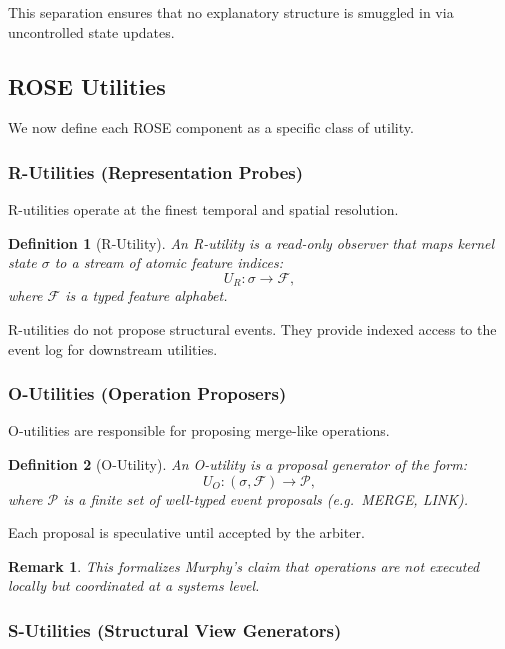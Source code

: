 \documentclass[11pt]{article}
\newtheorem{definition}{Definition}
\newtheorem{remark}{Remark}
\begin{document}
This separation ensures that no explanatory structure is smuggled in via uncontrolled state updates.

\subsection{ROSE Utilities}

We now define each ROSE component as a specific class of utility.

\subsubsection{R-Utilities (Representation Probes)}

R-utilities operate at the finest temporal and spatial resolution.

\begin{definition}[R-Utility]
An R-utility is a read-only observer that maps kernel state $\sigma$ to a stream of atomic feature indices:
\[
U_R : \sigma \to \mathcal{F},
\]
where $\mathcal{F}$ is a typed feature alphabet.
\end{definition}

R-utilities do not propose structural events. They provide indexed access to the event log for downstream utilities.

\subsubsection{O-Utilities (Operation Proposers)}

O-utilities are responsible for proposing merge-like operations.

\begin{definition}[O-Utility]
An O-utility is a proposal generator of the form:
\[
U_O : (\sigma, \mathcal{F}) \to \mathcal{P},
\]
where $\mathcal{P}$ is a finite set of well-typed event proposals (e.g.\ MERGE, LINK).
\end{definition}

Each proposal is speculative until accepted by the arbiter.

\begin{remark}
This formalizes Murphy’s claim that operations are not executed locally but coordinated at a systems level.
\end{remark}

\subsubsection{S-Utilities (Structural View Generators)}
\end{document}
